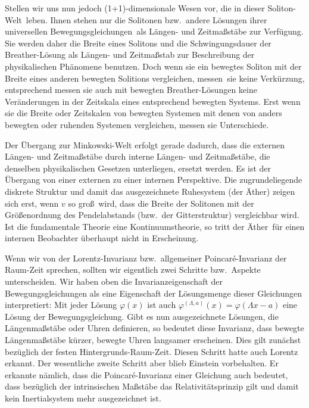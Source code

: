 Stellen wir uns nun jedoch (1+1)-dimensionale Wesen vor, die in dieser
\glqq Soliton-Welt\grqq\ leben. Ihnen stehen nur die Solitonen bzw.\ andere 
L\"osungen ihrer \glqq universellen Be\-we\-gungs\-glei\-chungen\grqq\ 
als L\"angen- und Zeitma\ss st\"abe zur Verf\"{u}gung. Sie werden daher
die Breite eines Solitons und die Schwingungsdauer der Breather-L\"osung
als L\"angen- und Zeitma\ss stab zur Beschreibung der physikalischen
Ph\"anomene benutzen. Doch wenn sie ein bewegtes Soliton mit
der Breite eines anderen bewegten Solitions vergleichen, \glqq messen\grqq\
sie keine Verk\"urzung, entsprechend messen sie auch mit
bewegten Breather-L\"osungen keine Ver\"anderungen in der
Zeitskala eines entsprechend bewegten Systems. Erst wenn sie
die Breite oder Zeitskalen von bewegten Systemen mit denen
von anders bewegten oder ruhenden Systemen vergleichen,
messen sie Unterschiede.

Der \"Ubergang zur Minkowski-Welt erfolgt gerade 
dadurch, dass die externen L\"angen- und Zeitma\ss st\"abe 
durch interne L\"angen- und Zeitma\ss st\"abe, die
denselben physikalischen Gesetzen unterliegen,
ersetzt werden. Es ist der \"Ubergang von
einer externen zu einer internen Perspektive.
Die zugrundeliegende diskrete Struktur 
und damit das ausgezeichnete Ruhesystem (der \glqq \"Ather\grqq) zeigen sich 
erst, wenn $v$ so gro\ss\ wird, dass die Brei\-te der Solitonen mit der 
Gr\"o\ss enordnung des 
Pendelabstands (bzw.\ der Gitterstruktur) vergleichbar wird. Ist die
fundamentale Theorie eine Kontinuumstheorie, 
so tritt der \glqq \"Ather\grqq\ 
f\"ur einen internen Beobachter \"uberhaupt nicht in Erscheinung.

Wenn wir von der Lorentz-Invarianz bzw.\ allgemeiner Poincar\'e-Invarianz
\index{Lorentz-Invarianz}
der Raum-Zeit sprechen, sollten wir eigentlich zwei Schritte bzw.\
Aspekte unterscheiden. Wir haben oben die Invarianzeigenschaft der
Bewegungsgleichungen als eine Eigenschaft der L\"osungsmenge dieser
Gleichungen interpretiert: Mit jeder L\"osung
$\varphi(x)$ ist auch $\varphi^{(\Lambda,a)}(x)=\varphi(\Lambda x -a)$  
eine L\"osung der Bewegungsgleichung. Gibt es nun ausgezeichnete
L\"osungen, die L\"angenma\ss st\"abe oder Uhren definieren, so bedeutet
diese Invarianz, dass bewegte L\"angenma\ss st\"abe k\"urzer, bewegte
Uhren langsamer erscheinen. Dies gilt zun\"achst bez\"uglich der
festen \glqq Hintergrunds-Raum-Zeit\grqq. Diesen Schritt hatte auch Lorentz
erkannt. Der wesentliche zweite Schritt aber blieb Einstein vorbehalten.
Er erkannte n\"amlich, dass die Poincar\'e-Invarianz einer Gleichung
auch bedeutet, dass bez\"uglich der intrinsischen Ma\ss st\"abe
das Relativit\"atsprinzip gilt und damit kein Inertialsystem
mehr ausgezeichnet ist. 

